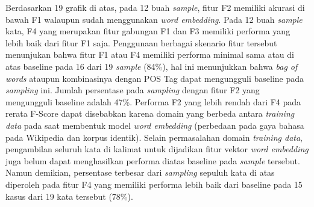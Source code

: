 Berdasarkan 19 grafik di atas, pada 12 buah \textit{sample}, fitur F2 memiliki akurasi di bawah F1 walaupun sudah menggunakan \textit{word embedding}. Pada 12 buah \textit{sample} kata, F4 yang merupakan fitur gabungan F1 dan F3 memiliki performa yang lebih baik dari fitur F1 saja. Penggunaan berbagai skenario fitur tersebut menunjukan bahwa fitur F1 atau F4 memiliki performa minimal sama atau di atas baseline pada 16 dari 19 \textit{sample} (84\%), hal ini menunjukkan bahwa \textit{bag of words} ataupun kombinasinya dengan POS Tag dapat mengungguli baseline pada \textit{sampling} ini. Jumlah persentase pada \textit{sampling} dengan fitur F2 yang mengungguli baseline adalah 47\%. Performa F2 yang lebih rendah dari F4 pada rerata F-Score dapat disebabkan karena domain yang berbeda antara \textit{training data} pada saat membentuk model \textit{word embedding} (perbedaan pada gaya bahasa pada Wikipedia dan korpus identik). Selain permasalahan domain \textit{training data}, pengambilan seluruh kata di kalimat untuk dijadikan fitur vektor \textit{word embedding} juga belum dapat menghasilkan performa diatas baseline pada \textit{sample} tersebut. Namun demikian, persentase terbesar dari \textit{sampling} sepuluh kata di atas diperoleh pada fitur F4 yang memiliki performa lebih baik dari baseline pada 15 kasus dari 19 kata tersebut (78\%).
